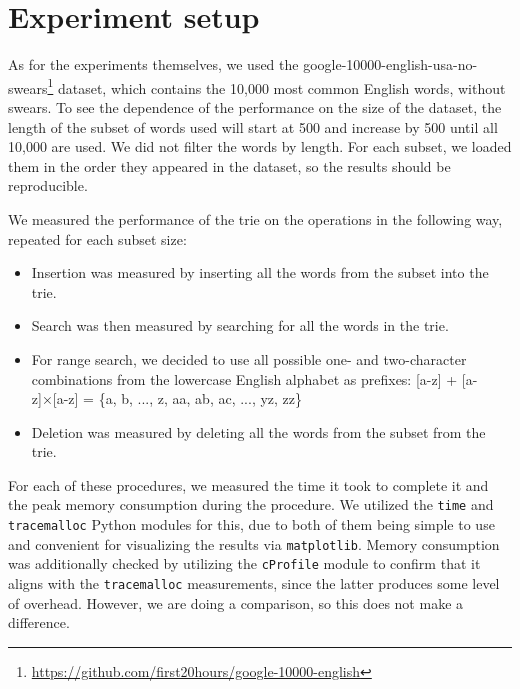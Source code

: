 \documentclass[essay]{fer}
\begin{document}
\chapter{Experiment setup}
\label{chptr:experiment_setup}

As for the experiments themselves, we used the google-10000-english-usa-no-swears\footnote[4]{\href{https://github.com/first20hours/google-10000-english}{https://github.com/first20hours/google-10000-english}} dataset, which contains the 10,000 most common English words, without swears.
To see the dependence of the performance on the size of the dataset,
the length of the subset of words used will start at 500 and increase by 500 until all 10,000 are used.
We did not filter the words by length. For each subset, we loaded them in the order they appeared in the dataset, so the results should be reproducible.

We measured the performance of the trie on the operations in the following way, repeated for each subset size:
\begin{itemize}
  \item Insertion was measured by inserting all the words from the subset into the trie.
  \item Search was then measured by searching for all the words in the trie.
  \item For range search, we decided to use all possible one- and two-character combinations from the lowercase English alphabet as prefixes:
        [a-z] + [a-z]×[a-z] = \{a, b, ..., z, aa, ab, ac, ..., yz, zz\}
  \item Deletion was measured by deleting all the words from the subset from the trie.
\end{itemize}

For each of these procedures, we measured the time it took to complete it and the peak memory consumption during the procedure.
We utilized the \texttt{time} and \texttt{tracemalloc} Python modules for this, due to both of them being simple to use and convenient for visualizing the results via \texttt{matplotlib}.
Memory consumption was additionally checked by utilizing the \texttt{cProfile} module to confirm that it aligns with the \texttt{tracemalloc} measurements, since the latter produces some level of overhead. However, we are doing a comparison, so this does not make a difference.


\end{document}
